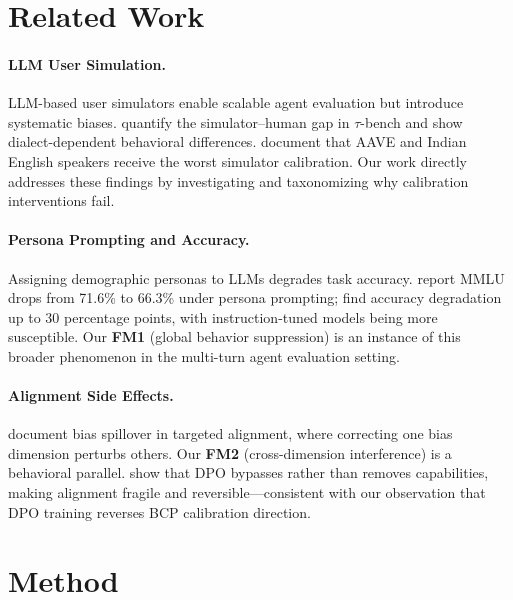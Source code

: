 \documentclass[11pt]{article}
\newcommand{\taubench}{$\tau$-bench}
\newcommand{\fm}[1]{\textbf{FM#1}}
\begin{document}
\section{Related Work}

\paragraph{LLM User Simulation.}
LLM-based user simulators enable scalable agent evaluation \citep{yao2024taubench} but introduce systematic biases. \citet{sim2real2026gap} quantify the simulator--human gap in \taubench{} and show dialect-dependent behavioral differences. \citet{seshadri2026lost} document that AAVE and Indian English speakers receive the worst simulator calibration. Our work directly addresses these findings by investigating and taxonomizing why calibration interventions fail.

\paragraph{Persona Prompting and Accuracy.}
Assigning demographic personas to LLMs degrades task accuracy. \citet{basil2025playing_pretend} report MMLU drops from 71.6\% to 66.3\% under persona prompting; \citet{hu2026expert_persona} find accuracy degradation up to 30 percentage points, with instruction-tuned models being more susceptible. Our \fm{1} (global behavior suppression) is an instance of this broader phenomenon in the multi-turn agent evaluation setting.

\paragraph{Alignment Side Effects.}
\citet{gupta2026intra_fairness} document bias spillover in targeted alignment, where correcting one bias dimension perturbs others. Our \fm{2} (cross-dimension interference) is a behavioral parallel. \citet{lee2024dpo_toxicity} show that DPO bypasses rather than removes capabilities, making alignment fragile and reversible---consistent with our observation that DPO training reverses BCP calibration direction.

\section{Method}
\end{document}
